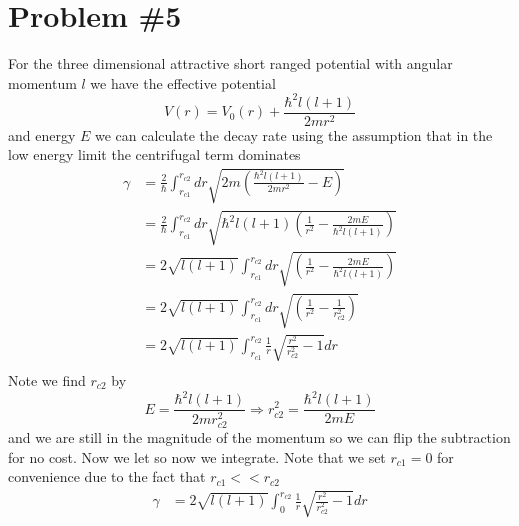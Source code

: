 \documentclass[11pt]{article}
\numberwithin{equation}{section}
\begin{document}
\section{Problem \#5}
For the three dimensional attractive short ranged potential with angular momentum $l$ we have the effective potential
$$V(r) = V_0(r) + \frac{\hbar^2l(l+1)}{2mr^2}$$
and energy $E$ we can calculate the decay rate using the assumption that in the low energy limit the centrifugal term dominates
\begin{align*}
\gamma &= \frac{2}{\hbar}\int_{r_{c1}}^{r_{c2}}dr\sqrt{2m\left(\frac{\hbar^2l(l+1)}{2mr^2} - E\right)}\\
&= \frac{2}{\hbar}\int_{r_{c1}}^{r_{c2}}dr\sqrt{\hbar^2l(l+1)\left(\frac{1}{r^2} - \frac{2mE}{\hbar^2l(l+1)}\right)}\\
&= 2\sqrt{l(l+1)}\int_{r_{c1}}^{r_{c2}}dr\sqrt{\left(\frac{1}{r^2} - \frac{2mE}{\hbar^2l(l+1)}\right)}\\
&= 2\sqrt{l(l+1)}\int_{r_{c1}}^{r_{c2}}dr\sqrt{\left(\frac{1}{r^2} - \frac{1}{r_{c2}^2}\right)}\\
&= 2\sqrt{l(l+1)}\int_{r_{c1}}^{r_{c2}}\frac{1}{r}\sqrt{\frac{r^2}{r_{c2}^2} - 1}dr\\
\end{align*}
Note we find $r_{c2}$ by
$$E = \frac{\hbar^2l(l+1)}{2mr_{c2}^2} \Rightarrow r_{c2}^2 = \frac{\hbar^2l(l+1)}{2mE}$$
and we are still in the magnitude of the momentum so we can flip the subtraction for no cost. Now we let 
so now we integrate. Note that we set $r_{c1} = 0$ for convenience due to the fact that $r_{c1}<<r_{c2}$
\begin{align*}
\gamma &= 2\sqrt{l(l+1)}\int_{0}^{r_{c2}}\frac{1}{r}\sqrt{\frac{r^2}{r_{c2}^2} - 1}dr
\end{align*}
\end{document}
